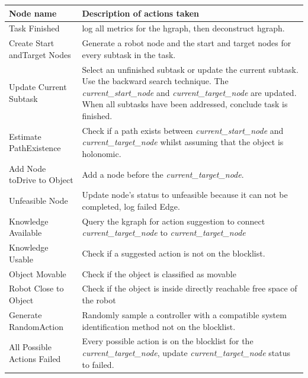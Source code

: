 

\begin{table}[H]
\centering
{}
\begin{tabular}%
  {>{\raggedright\arraybackslash}p{}%
    >{\raggedright\arraybackslash}p{}}
\textbf{Node name} & \textbf{Description of actions taken}\\\toprule
Task Finished & log all metrics for the \ac{hgraph}, then deconstruct \ac{hgraph}.\\
Create Start and\newline Target Nodes & Generate a robot node and the start and target nodes for every subtask in the task.\\
Update Current Subtask & Select an unfinished subtask or update the current subtask. Use the backward search technique. The \textit{current\_start\_node} and \textit{current\_target\_node} are updated. When all subtasks have been addressed, conclude task is finished. \\
Estimate Path\newline Existence & Check if a path exists between \textit{current\_start\_node} and \textit{current\_target\_node} whilst assuming that the object is holonomic.\\
Add Node to\newline Drive to Object & Add a node before the \textit{current\_target\_node}.\\
Unfeasible Node & Update node's status to unfeasible because it can not be completed, log failed Edge.\\
Knowledge Available& Query the \ac{kgraph} for action suggestion to connect \textit{current\_target\_node} to \textit{current\_target\_node}\\
Knowledge Usable& Check if a suggested action is not on the blocklist.\\
Object Movable & Check if the object is classified as movable\\
Robot Close to Object& Check if the object is inside directly reachable free space of the robot \\
Generate Random\newline Action& Randomly sample a controller with a compatible system identification method not on the blocklist. \\
All Possible Actions Failed & Every possible action is on the blocklist for the \textit{current\_target\_node}, update \textit{current\_target\_node} status to failed.\\

\end{tabular}
\end{table}
